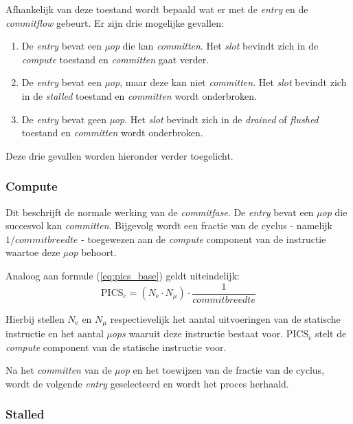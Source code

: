 \documentclass[12pt,a4paper,faculty=ea,language=nl]{ugent-doc}
\begin{document}
Afhankelijk van deze toestand wordt bepaald wat er met de \textit{entry} en de \textit{commitflow} gebeurt. Er zijn drie mogelijke gevallen:
\begin{enumerate}
    \item De \textit{entry} bevat een \textit{µop} die kan \textit{committen}. Het \textit{slot} bevindt zich in de \textit{compute} toestand en \textit{committen} gaat verder.
    \item De \textit{entry} bevat een \textit{µop}, maar deze kan niet \textit{committen}. Het \textit{slot} bevindt zich in de \textit{stalled} toestand en \textit{committen} wordt onderbroken.
    \item De \textit{entry} bevat geen \textit{µop}. Het \textit{slot} bevindt zich in de \textit{drained} of \textit{flushed} toestand en \textit{committen} wordt onderbroken.
\end{enumerate}

Deze drie gevallen worden hieronder verder toegelicht.

\subsubsection{Compute}

Dit beschrijft de normale werking van de \textit{commitfase}. De \textit{entry} bevat een \textit{µop} die succesvol kan \textit{committen}. Bijgevolg wordt een fractie van de cyclus - namelijk \(1 / \textit{commitbreedte}\) - toegewezen aan de \textit{compute} component van de instructie waartoe deze \textit{µop} behoort.

Analoog aan formule (\ref{eq:pics_base}) geldt uiteindelijk:
\begin{equation}
    \text{PICS}_{\text{c}} = (N_{\text{e}} \cdot N_{\mu}) \cdot \frac{1}{commitbreedte}
    \label{eq:pics_compute}
\end{equation}

Hierbij stellen $N_{\text{e}}$ en $N_{\mu}$ respectievelijk het aantal uitvoeringen van de statische instructie en het aantal \textit{µops} waaruit deze instructie bestaat voor.
$\text{PICS}_{\text{c}}$ stelt de \textit{compute} component van de statische instructie voor.

Na het \textit{committen} van de \textit{µop} en het toewijzen van de fractie van de cyclus, wordt de volgende \textit{entry} geselecteerd en wordt het proces herhaald.

\subsubsection{Stalled}
\end{document}
